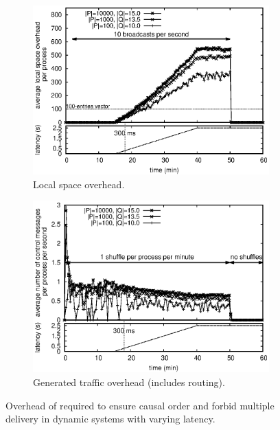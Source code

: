 \begin{figure}
  \begin{center}
    \begin{subfigure}[t]{0.495\textwidth}
    \includegraphics[width=1\textwidth]{./img/overhead.eps}
    \caption{\label{fig:overhead}Local space overhead.}
    \end{subfigure}
    \begin{subfigure}[t]{0.495\textwidth}      
      \includegraphics[width=1\textwidth]{./img/controlmessages.eps}
      \caption{\label{fig:controlmessages}Generated traffic overhead (includes
        routing).}
    \end{subfigure}
    \caption{Overhead of \RPCBROADCAST required to ensure causal order and
      forbid multiple delivery in dynamic systems with varying latency.}
  \end{center}
\end{figure}




